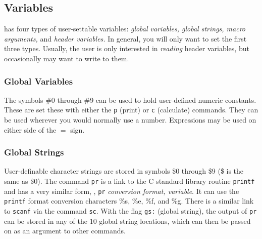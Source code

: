 \subsection{Variables}

\COMB has four types of user-settable variables: {\it global variables,
global strings, macro arguments,} and {\it header variables.} 
In general, you will only want to set the first three types. Usually, 
the user is only interested in {\em reading\/} header variables, but occasionally   
may want to write to them.

\subsubsection{Global Variables}
The symbols \#0 through \#9 can be used
to hold user-defined numeric constants.  These are set these with 
either the {\tt p} (print) or {\tt c} (calculate) commands. They
can be used wherever you would normally use a number.
\smallskip
{}
\smallskip\noindent
Expressions may be used on either side of the $=$ sign.
\smallskip
{}
\subsubsection{Global Strings}
User-definable character strings are stored
in symbols \$0 through \$9 (\$ is the same as \$0).
\smallskip
{}
\smallskip\noindent
The command {\tt pr} is a link to the C standard library routine {\tt printf}
and has a very similar form, \ie, {\tt pr} {\it conversion format, variable}.
It can use the {\tt printf} format conversion characters \%s, \%e, \%f, and \%g.
There is a similar link to {\tt scanf} via the command {\tt sc}.
\smallskip\noindent
With the flag {\tt gs:} (global string), the output of {\tt pr} can be
stored in any of the 10 global string locations, which can then be
passed on as an argument to other commands.

